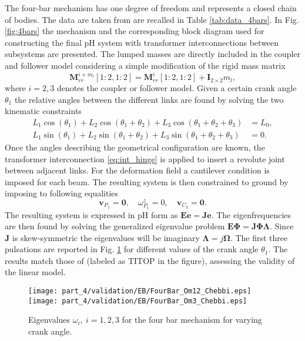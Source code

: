 The four-bar mechanism has one degree of freedom and represents a closed chain of bodies. The data are taken from \cite{kitis1990natural,chebbi2017} are recalled in Table \ref{tab:data_4bars}. In Fig. \ref{fig:4bars} the mechanism and the corresponding block diagram used for constructing the final pH system with transformer interconnections between subsystems are presented. The lumped masses are directly included in the coupler and follower model considering a simple modification of the rigid mass matrix
\begin{equation*}
\mathbf{M}_{rr}^{i + m_l}[1:2,1:2] = \mathbf{M}_{rr}^{i}[1:2,1:2] + \mathbf{I}_{2\times 2} m_l,
\end{equation*} 
where $i=2,3$ denotes the coupler or follower model. Given a certain crank angle $\theta_1$ the relative angles between the different links are found by solving the two kinematic constraints
\begin{align*}
L_1 \cos(\theta_1)+ L_2 \cos(\theta_1+\theta_2)+ L_3 \cos(\theta_1+\theta_2+\theta_3) &=L_0, \\
L_1 \sin(\theta_1)+L_2 \sin(\theta_1+\theta_2)+L_3 \sin(\theta_1+\theta_2+\theta_3) &=0.
\end{align*} 
Once the angles describing the geometrical configuration are known, the transformer interconnection \eqref{eq:int_hinge} is applied to insert a revolute joint between adjacent links. For the deformation field a cantilever condition is imposed for each beam. The resulting system is then constrained to ground by imposing to following equalities
\begin{equation*}
\mathbf{v}_{P_1} = \mathbf{0}, \quad \omega^z_{P_1} = 0, \quad \mathbf{v}_{C_3} = \mathbf{0}.
\end{equation*}
The resulting system is expressed in pH form as $\mathbf{E}\dot{\mathbf{e}} = \mathbf{J} \mathbf{e}$. The eigenfrequencies are then found by solving the generalized eigenvalue problem $\mathbf{E}\bm{\Phi} = \mathbf{J} \bm{\Phi \Lambda}$. Since $\mathbf{J}$ is skew-symmetric the eigenvalues will be imaginary $\bm{\Lambda} = j \bm{\Omega}$. The first three pulsations  are reported in Fig. \ref{fig:omega_4bars} for different values of the crank angle $\theta_1$. The results match those of \cite{chebbi2017} (labeled as TITOP in the figure), assessing the validity of the linear model.

\begin{figure}[tb]
	\centering
	\texttt{[image: part\_4/validation/EB/FourBar\_Om12\_Chebbi.eps]} 
	\texttt{[image: part\_4/validation/EB/FourBar\_Om3\_Chebbi.eps]} 
	\caption{Eigenvalues $\omega_i, \ i=1,2,3$ for the four bar mechanism for varying crank angle.}
	\label{fig:omega_4bars}
\end{figure}

